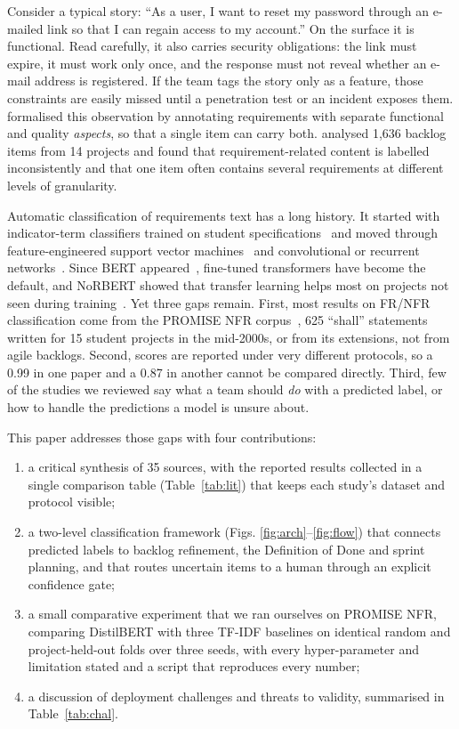 \documentclass[conference,10pt,letterpaper]{IEEEtran}
\begin{document}
Consider a typical story: “As a user, I want to reset my password through an e-mailed link so that I can regain access to my account.” On the surface it is functional. Read carefully, it also carries security obligations: the link must expire, it must work only once, and the response must not reveal whether an e-mail address is registered. If the team tags the story only as a feature, those constraints are easily missed until a penetration test or an incident exposes them. \textcite{dalpiaz2019} formalised this observation by annotating requirements with separate functional and quality \emph{aspects}, so that a single item can carry both. \Textcite{vancan2025} analysed 1,636 backlog items from 14 projects and found that requirement-related content is labelled inconsistently and that one item often contains several requirements at different levels of granularity.

Automatic classification of requirements text has a long history. It started with indicator-term classifiers trained on student specifications~\cite{clelandhuang2007} and moved through feature-engineered support vector machines~\cite{kurtanovic2017,diascanedo2020} and convolutional or recurrent networks~\cite{rahman2019,rahimi2021}. Since BERT appeared~\cite{devlin2019}, fine-tuned transformers have become the default, and NoRBERT showed that transfer learning helps most on projects not seen during training~\cite{hey2020norbert,hey2022corrected}. Yet three gaps remain. First, most results on FR/NFR classification come from the PROMISE NFR corpus~\cite{promisenfr2007}, 625 “shall” statements written for 15 student projects in the mid-2000s, or from its extensions, not from agile backlogs. Second, scores are reported under very different protocols, so a 0.99 in one paper and a 0.87 in another cannot be compared directly. Third, few of the studies we reviewed say what a team should \emph{do} with a predicted label, or how to handle the predictions a model is unsure about.

This paper addresses those gaps with four contributions:

\begin{enumerate}
\item a critical synthesis of 35 sources, with the reported results collected in a single comparison table (Table~\ref{tab:lit}) that keeps each study's dataset and protocol visible;
\item a two-level classification framework (Figs. \ref{fig:arch}–\ref{fig:flow}) that connects predicted labels to backlog refinement, the Definition of Done and sprint planning, and that routes uncertain items to a human through an explicit confidence gate;
\item a small comparative experiment that we ran ourselves on PROMISE NFR, comparing DistilBERT with three TF-IDF baselines on identical random and project-held-out folds over three seeds, with every hyper-parameter and limitation stated and a script that reproduces every number;
\item a discussion of deployment challenges and threats to validity, summarised in Table~\ref{tab:chal}.
\end{enumerate}
\end{document}
